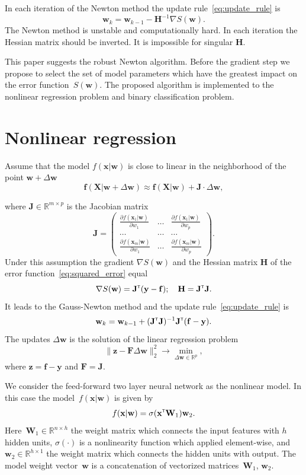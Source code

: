 \documentclass[a4paper,12pt]{article}
\theoremstyle{plain} %
\theoremstyle{definition} %
\theoremstyle{remark} %
\newcommand{\bw}{\mathbf{w}}
\newcommand{\by}{\mathbf{y}}
\newcommand{\bx}{\mathbf{x}}
\newcommand{\bz}{\mathbf{z}}
\newcommand{\bJ}{\mathbf{J}}
\newcommand{\bbR}{\mathbb{R}}
\newcommand{\bW}{\mathbf{W}}
\newcommand{\bH}{\mathbf{H}}
\newcommand{\bF}{\mathbf{F}}
\newcommand{\bX}{\mathbf{X}}
\newcommand{\T}{{\text{\tiny\sffamily\upshape\mdseries T}}}
\begin{document}
	In each iteration of the Newton method the update rule~\eqref{eq:update_rule} is
	\[
		\bw_k = \bw_{k-1} - \bH^{-1} \nabla S(\bw).
	\]
	The Newton method is unstable and computationally hard. In each iteration the Hessian matrix should be inverted. It is impossible for singular $\bH$.
	
	This paper suggests the robust Newton algorithm. 
	Before the gradient step we propose to select the set of model parameters which have the greatest impact on the error function~$S(\bw)$.
	The proposed algorithm is implemented to the nonlinear regression problem and binary classification problem.
	
	\section*{Nonlinear regression}
	Assume that the model $f(\bx | \bw)$ is close to linear in the neighborhood of the point $\bw + \Delta \bw$
	\[
	\mathbf{f}(\bX | \bw + \Delta \bw) \approx \mathbf{f}(\bX | \bw) + \bJ \cdot \Delta  \bw,
	\]
	
	where $\mathbf{J} \in \bbR^{m \times p}$ is the Jacobian matrix
	\begin{equation}
		\bJ = 
		\begin{pmatrix}
		\frac{\partial f(\bx_1 | \bw)}{\partial w_1} & \dots & 
		\frac{\partial f(\bx_1 | \bw)}{\partial w_p} \\
		\dots & \dots & \dots \\
		\frac{\partial f(\bx_m | \bw)}{\partial w_1} & \dots & 
		\frac{\partial f(\bx_m | \bw)}{\partial w_p}
		\end{pmatrix}.
	\end{equation}
	Under this assumption the gradient $\nabla S(\bw)$ and the Hessian matrix $\bH$ of the error function~\eqref{eq:squared_error} equal
	\[
		\nabla S(\bw) = \bJ^{\T} (\by - \mathbf{f}); \quad \bH = \bJ^{\T} \bJ.
	\]
	It leads to the Gauss-Newton method and the update rule~\eqref{eq:update_rule} is 
	\[
		\bw_k = \bw_{k - 1} + (\bJ^{\T} \bJ)^{-1}\bJ^{\T}(\mathbf{f} - \by).
	\]
	The updates $\Delta \bw$ is the solution of the linear regression problem
	\begin{equation}
		\| \bz - \bF \Delta \bw \|_2^2 \rightarrow \min_{\Delta \bw \in \bbR^{p}},
		\label{eq:lin_reg_nonlin_reg}
	\end{equation}
	where $\bz = \mathbf{f} - \by$ and $\bF = \bJ$.
	
	We consider the feed-forward two layer neural network as the nonlinear model. In this case the model~$f(\bx | \bw)$ is given by
	\[
	f(\bx | \bw) = \sigma(\bx^{\T} \bW_1) \bw_2.
	\]
	Here~$\bW_1 \in \bbR^{n \times h}$ the weight matrix which connects the input features with $h$ hidden units, $\sigma(\cdot)$ is a nonlinearity function which applied element-wise, and $\bw_2 \in \bbR^{h \times 1}$ the weight matrix which connects the hidden units with output. 
	The model weight vector~$\bw$ is a concatenation of vectorized matrices~$\bW_1$, $\bw_2$.
	
\end{document}
